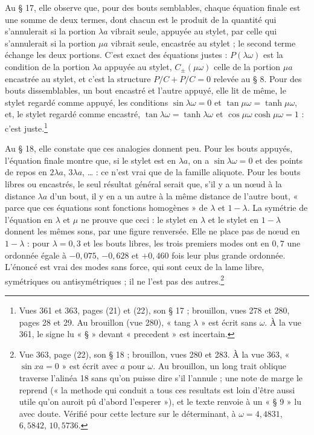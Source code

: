 \documentclass[11pt,a4paper]{article}
\begin{document}
Au § 17, elle observe que, pour des bouts semblables, chaque équation finale est une somme de deux termes, dont chacun est le produit de la quantité qui s'annulerait si la portion $\lambda a$ vibrait seule, appuyée au stylet, par celle qui s'annulerait si la portion $\mu a$ vibrait seule, encastrée au stylet ; le second terme échange les deux portions. C'est exact des équations justes : $P(\lambda\omega)$ est la condition de la portion $\lambda a$ appuyée au stylet, $C_{\pm}(\mu\omega)$ celle de la portion $\mu a$ encastrée au stylet, et c'est la structure $P/C+P/C=0$ relevée au § 8. Pour des bouts dissemblables, un bout encastré et l'autre appuyé, elle lit de même, le stylet regardé comme appuyé, les conditions $\sin\lambda\omega=0$ et $\tan\mu\omega=\tanh\mu\omega$, et, le stylet regardé comme encastré, $\tan\lambda\omega=\tanh\lambda\omega$ et $\cos\mu\omega\cosh\mu\omega=1$ : c'est juste.\footnote{Vues 361 et 363, pages (21) et (22), son § 17 ; brouillon, vues 278 et 280, pages 28 et 29. Au brouillon (vue 280), « tang $\lambda$ » est écrit sans $\omega$. À la vue 361, le signe lu « § » devant « precedent » est incertain.}

Au § 18, elle constate que ces analogies donnent peu. Pour les bouts appuyés, l'équation finale montre que, si le stylet est en $\lambda a$, on a $\sin\lambda\omega=0$ et des points de repos en $2\lambda a$, $3\lambda a$, … : ce n'est vrai que de la famille aliquote. Pour les bouts libres ou encastrés, le seul résultat général serait que, s'il y a un nœud à la distance $\lambda a$ d'un bout, il y en a un autre à la même distance de l'autre bout, « parce que ces équations sont fonctions homogènes » de $\lambda$ et $1-\lambda$. La symétrie de l'équation en $\lambda$ et $\mu$ ne prouve que ceci : le stylet en $\lambda$ et le stylet en $1-\lambda$ donnent les mêmes sons, par une figure renversée. Elle ne place pas de nœud en $1-\lambda$ : pour $\lambda=0{,}3$ et les bouts libres, les trois premiers modes ont en $0{,}7$ une ordonnée égale à $-0{,}075$, $-0{,}628$ et $+0{,}460$ fois leur plus grande ordonnée. L'énoncé est vrai des modes sans force, qui sont ceux de la lame libre, symétriques ou antisymétriques ; il ne l'est pas des autres.\footnote{Vue 363, page (22), son § 18 ; brouillon, vues 280 et 283. À la vue 363, « $\sin xa=0$ » est écrit avec $a$ pour $\omega$. Au brouillon, un long trait oblique traverse l'alinéa 18 sans qu'on puisse dire s'il l'annule ; une note de marge le reprend (« la methode qui conduit a tous ces resultats est loin d'être aussi utile qu'on auroit pû d'abord l'esperer »), et le texte renvoie à un « § 9 » lu avec doute. Vérifié pour cette lecture sur le déterminant, à $\omega=4{,}4831$, $6{,}5842$, $10{,}5736$.}
\end{document}
